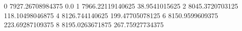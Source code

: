 0 7927.26708984375 0.0
1 7966.22119140625 38.9541015625
2 8045.3720703125 118.10498046875
4 8126.744140625 199.47705078125
6 8150.9599609375 223.69287109375
8 8195.0263671875 267.75927734375
